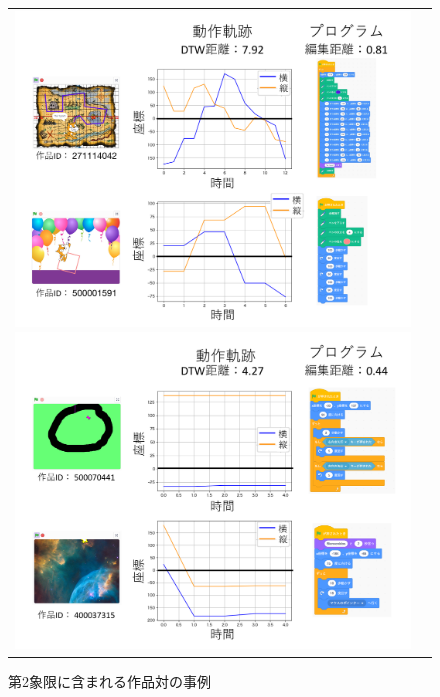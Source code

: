 \documentclass[T,J]{fose} %
\begin{document}
\begin{figure}[t]
    \begin{tabular}{cc}
  \begin{minipage}[t]{0.45\linewidth}
    \centering
	\includegraphics[keepaspectratio, scale=0.14]{Okamoto_fig/quadrant-1.pdf}
    \caption{第1象限に含まれる作品対の事例}
    \label{fig:distance-boxplot1}
  \end{minipage}
  \begin{minipage}[t]{0.45\linewidth}
    \centering
	\includegraphics[keepaspectratio, scale=0.14]{Okamoto_fig/quadrant-2.pdf}
	\caption{第2象限に含まれる作品対の事例}
	\label{fig:distance-boxplot2}
  \end{minipage}
    \end{tabular}


\end{figure}
\end{document}
